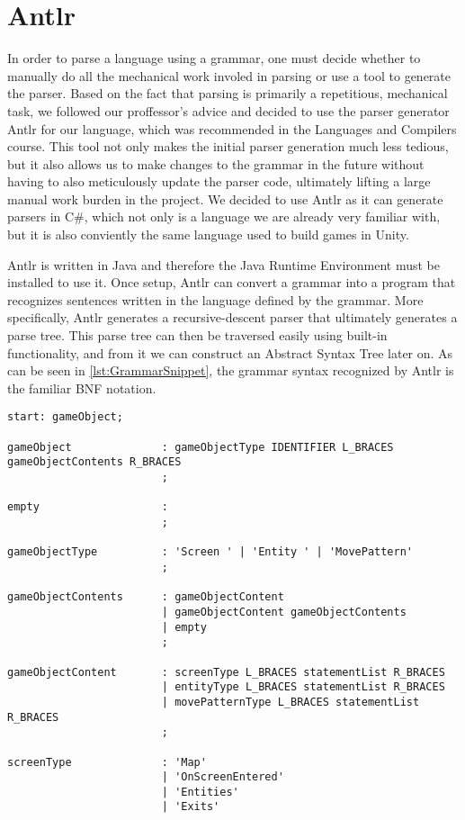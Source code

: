 \section{Antlr}
In order to parse a language using a grammar, one must decide whether to manually do all the mechanical work involed in parsing or use a tool to generate the parser.
Based on the fact that parsing is primarily a repetitious, mechanical task, we followed our proffessor's advice and decided to use the parser generator Antlr for our language, which was recommended in the Languages and Compilers course. 
This tool not only makes the initial parser generation much less tedious, but it also allows us to make changes to the grammar in the future without having to also meticulously update the parser code, ultimately lifting a large manual work burden in the project.
We decided to use Antlr as it can generate parsers in C\#, which not only is a language we are already very familiar with, but it is also conviently the same language used to build games in Unity. \

Antlr is written in Java and therefore the Java Runtime Environment must be installed to use it. 
Once setup, Antlr can convert a grammar into a program that recognizes sentences written in the language defined by the grammar.
More specifically, Antlr generates a recursive-descent parser that ultimately generates a parse tree.
This parse tree can then be traversed easily using built-in functionality, and from it we can construct an Abstract Syntax Tree later on.
As can be seen in \ref{lst:GrammarSnippet}, the grammar syntax recognized by Antlr is the familiar BNF notation.

\begin{lstlisting}[caption={A snippet of the \dazel{} grammar used by Antlr to generate the parser}, label={lst:GrammarSnippet},escapechar=|]
start: gameObject;

gameObject              : gameObjectType IDENTIFIER L_BRACES gameObjectContents R_BRACES
                        ;

empty                   : 
                        ;

gameObjectType          : 'Screen ' | 'Entity ' | 'MovePattern' 
                        ;

gameObjectContents      : gameObjectContent
                        | gameObjectContent gameObjectContents
                        | empty
                        ;

gameObjectContent       : screenType L_BRACES statementList R_BRACES
                        | entityType L_BRACES statementList R_BRACES
                        | movePatternType L_BRACES statementList R_BRACES
                        ;

screenType              : 'Map'                 
                        | 'OnScreenEntered'
                        | 'Entities'
                        | 'Exits'
\end{lstlisting}


